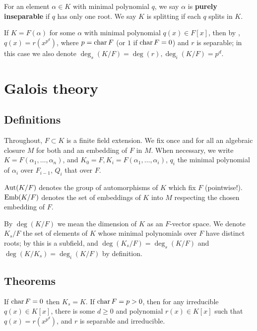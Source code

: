 \begin{definition}
For an element $\alpha \in K$ with minimal polynomial $q$, we say $\alpha$ is \textbf{purely
inseparable} if $q$ has only one root.  We say $K$ is splitting if each $q$
splits in $K$.
\label{def:sepsplit}
\end{definition}


\begin{definition} If $K = F(\alpha)$ for some $\alpha$ with minimal polynomial
$q(x) \in F[x]$, then by , $q(x) = r(x^{p^d})$, where $p =
\operatorname{\text{char}}{F}$ (or $1$ if $\operatorname{\text{char}}{F} = 0$) and $r$ is separable; in this case we
also denote $\deg_s(K/F) = \deg(r), \deg_i(K/F) = p^d$.  \label{def:prim_sep}
\end{definition}


\section{Galois theory}
\subsection{Definitions}

Throughout, $F \subset K$ is a finite field extension.  We fix once and for
all an algebraic closure $M$ for both and an embedding of $F$ in $M$.  When
necessary, we write $K = F(\alpha_1, \dots, \alpha_n)$, and $K_0 = F, K_i =
F(\alpha_1, \dots, \alpha_i)$, $q_i$ the minimal polynomial of $\alpha_i$ over
$F_{i - 1}$, $Q_i$ that over $F$.

\begin{definition} $\operatorname{\text{Aut}}(K/F)$ denotes the group of automorphisms of $K$ which fix
$F$ (pointwise!).  $\operatorname{\text{Emb}}(K/F)$ denotes the set of embeddings of $K$ into $M$
respecting the chosen embedding of $F$.
\label{def:gal}
\end{definition}

\begin{definition} By $\deg(K/F)$ we mean the dimension of $K$ as an $F$-vector
space.  We denote $K_s/F$ the set of elements of $K$ whose minimal polynomials
over $F$ have distinct roots; by  this is a subfield, and
$\deg(K_s/F) = \deg_s(K/F)$ and $\deg(K/K_s) = \deg_i(K/F)$ by definition.
\label{def:sep}
\end{definition}
\subsection{Theorems}
\begin{lemma} If $\operatorname{\text{char}}{F} = 0$ then $K_s = K$.  If $\operatorname{\text{char}}{F} = p > 0$, then for
any irreducible $q(x) \in K[x]$, there is some $d \geq 0$ and polynomial $r(x)
\in K[x]$ such that $q(x) = r(x^{p^d})$, and $r$ is separable and irreducible.
\label{sep_poly}
\end{lemma}

